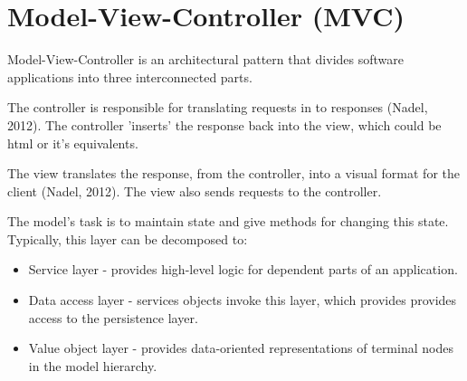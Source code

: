 \section{Model-View-Controller (MVC)}
Model-View-Controller is an architectural pattern that divides software applications into three interconnected parts. \\ \par
The controller is responsible for translating requests in to responses (Nadel, 2012). The controller 'inserts' the response back into the view, which could be html or it's equivalents. \par
The view translates the response, from the controller, into a visual format for the client (Nadel, 2012). The view also sends requests to the controller. \par
The model's task is to maintain state and give methods for changing this state. Typically, this layer can be decomposed to:
\begin{itemize}
\item Service layer - provides high-level logic for dependent parts of an application.
\item Data access layer - services objects invoke this layer, which provides provides access to the persistence layer.
\item Value object layer - provides data-oriented representations of terminal nodes in the model hierarchy.
\end{itemize}
